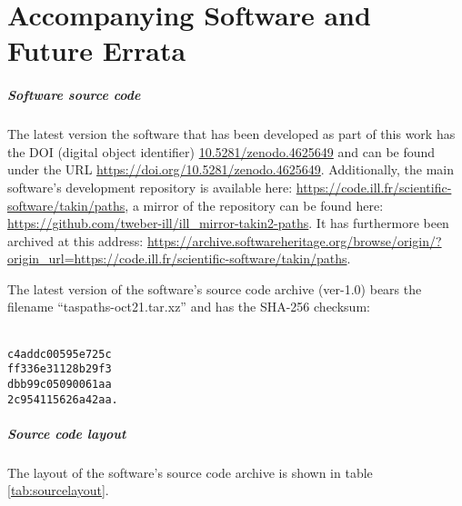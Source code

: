 %
%

\chapter{Accompanying Software and Future Errata}
\label{ch:online}

\paragraph{Software source code}
The latest version the software that has been developed 
as part of this work has the DOI (digital object identifier)
\href{https://doi.org/10.5281/zenodo.4625649}{10.5281/zenodo.4625649}
and can be found under the URL \url{https://doi.org/10.5281/zenodo.4625649}.
Additionally, the main software's development repository is available here: 
\url{https://code.ill.fr/scientific-software/takin/paths},
a mirror of the repository can be found here: 
\url{https://github.com/tweber-ill/ill_mirror-takin2-paths}.
It has furthermore been archived at this address:
\url{https://archive.softwareheritage.org/browse/origin/?origin_url=https://code.ill.fr/scientific-software/takin/paths}.

The latest version of the software's source code archive (ver-1.0) bears the 
filename ``taspaths-oct21.tar.xz'' and has the SHA-256 \cite{web_sha256sum}
checksum:

\begin{centering}
\texttt{\\
c4addc00595e725c\phantom{.} \\
ff336e31128b29f3\phantom{.} \\
dbb99c05090061aa\phantom{.} \\
2c954115626a42aa.}\\
\end{centering}


\paragraph{Source code layout}
The layout of the software's source code archive is shown in table \ref{tab:sourcelayout}.

